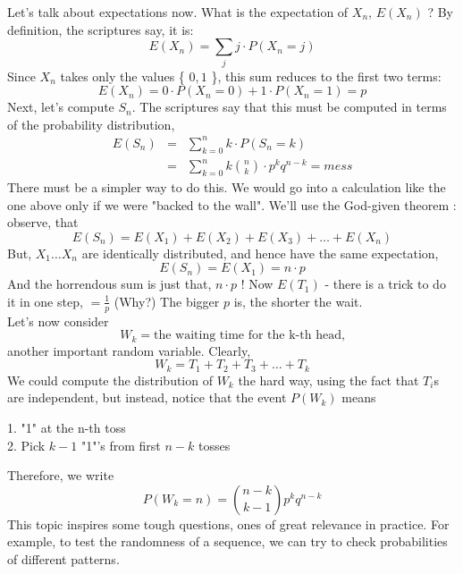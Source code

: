Let's talk about expectations now.
What is the expectation of $X_{n}$, $E(X_{n})$ ?
By definition, the scriptures say, it is:
\begin{equation}
E(X_{n}) = \sum_{j} j \cdot P(X_{n}=j)
\end{equation}
Since $X_{n}$ takes only the values \{ $0,1$ \}, this sum reduces to
the first two terms:
\begin{equation}
E(X_{n}) = 0 \cdot P(X_{n}=0) + 1 \cdot P(X_{n}=1) = p
\end{equation}
Next, let's compute $S_{n}$. The scriptures say that this must
be computed in terms of the probability distribution,
\begin{eqnarray*}
E(S_{n}) &=& \sum_{k=0}^{n}k\cdot P(S_{n}=k) \\
&=& \sum_{k=0}^{n}k{n \choose k} \cdot p^{k}q^{n-k} = mess
\end{eqnarray*}
There must be a simpler way to do this. We would go into a 
calculation like the one above only if we were "backed to the wall".
We'll use the God-given theorem : observe, that
\begin{equation}
E(S_{n}) = E(X_{1}) + E(X_{2}) + E(X_{3}) + \ldots + E(X_{n})  
\end{equation}
But, $X_{1} \ldots X_{n}$ are identically distributed, and hence
have the same expectation,
\begin{equation}
E(S_{n}) = E(X_{1}) = n \cdot p  
\end{equation}
And the horrendous sum is just that, $n \cdot p$ !
Now $E(T_{1})$ - there is a trick to do it in one step, 
$ = \frac{1}{p}$ (Why?)
The bigger $p$ is, the shorter the wait.\\
Let's now consider
\begin{equation}
W_{k} = \mbox{the waiting time for the k-th head,}
\end{equation}
another important random variable.
Clearly,
\begin{equation}
W_{k} = T_{1}+T_{2}+T_{3}+ \ldots + T_{k}
\end{equation}
We could compute the distribution of $W_{k}$ the hard way,
using the fact that $T_{i}$s are independent, but instead,
notice that the event $P(W_{k})$ means

1. "1" at the n-th toss \\
2. Pick $k-1$ "1"'s from first $n-k$ tosses

Therefore, we write
\begin{equation}
P(W_{k}=n)={{n-k}\choose {k-1}}p^{k}q^{n-k}
\end{equation}
This topic inspires some tough questions, ones of great
relevance in practice. For example, to test the randomness
of a sequence, we can try to check probabilities of different
patterns.

